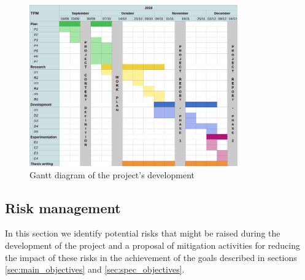 \documentclass[11pt]{article}
\begin{document}
\begin{figure}[h]
  \centering
    \includegraphics[width=0.8\textwidth]{figures/gantt.png}
      \caption{Gantt diagram of the project's development}
    \label{fig:gantt}
\end{figure}

\subsection{Risk management}
\label{sec:risk}

In this section we identify potential risks that might be raised during the development of the project and a proposal of mitigation activities for reducing the impact of these risks in the achievement of the goals described in sections \ref{sec:main_objectives} and \ref{sec:spec_objectives}.
\end{document}
